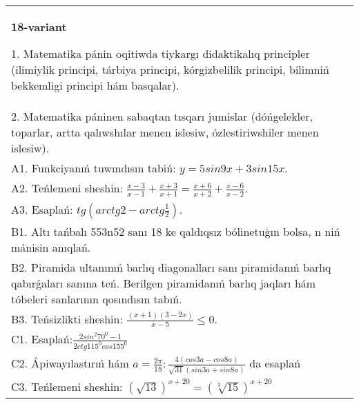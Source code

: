 \documentclass{article}
\begin{document}
\begin{tabular}{m{17cm}}
\textbf{18-variant}

1. Matematika pánin oqitiwda tiykargı didaktikalıq principler (ilimiylik principi, tárbiya principi, kórgizbelilik principi, bilimniń bekkemligi principi hám basqalar). \\
2. Matematika páninen sabaqtan tısqarı jumislar (dóńgelekler, toparlar, artta qalıwshılar menen islesiw, ózlestiriwshiler menen islesiw). \\
A1. Funkciyanıń tuwındısın tabiń: \(y = 5 sin 9x + 3 sin 15x\). \\
A2. Teńlemeni sheshin: \(\frac{x - 3}{x - 1} + \frac{x + 3}{x + 1} = \frac{x + 6}{x + 2} + \frac{x - 6}{x - 2}\). \\
A3. Esaplań: \(tg\left(arctg2 - arctg\frac{1}{2} \right) \). \\
B1. Altı tańbalı 553n52 sanı 18 ke qaldıqsız bólinetuģın bolsa, n niń mánisin anıqlań. \\
B2. Piramida ultanınıń barlıq diagonalları sanı piramidanıń barlıq qabırǵaları sanına teń. Berilgen piramidanıń barlıq jaqları hám tóbeleri sanlarının qosındısın tabıń. \\
B3. Teńsizlikti sheshin: \(\frac{ (x + 1) (3 - 2x) }{x - 5} \leq 0\). \\
C1. Esaplań:\(\frac{2sin^{2}70^{0} - 1}{2ctg115^{0}cos155^{0}}\) \\
C2. Ápiwayılastırıń hám \(a = \frac{2\pi}{15}:\frac{4 (cos3a - cos8a) }{\sqrt{31} (sin3a + sin8a) }\) da esaplań \\
C3. Teńlemeni sheshin: \((\sqrt{13}) ^{x + 20} = (\sqrt[3]{15}) ^{x + 20}\) \\

\end{tabular}
\vspace{1cm}
\end{document}
